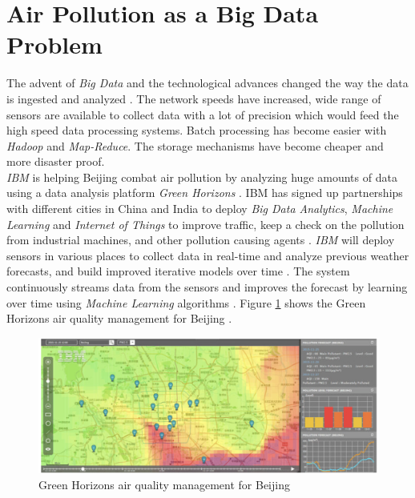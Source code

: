 \documentclass[sigconf]{acmart}
\begin{document}
\section{Air Pollution as a Big Data Problem}
The advent of {\em Big Data} and the technological advances changed the way the data is ingested and analyzed \cite{www-ibm1}. The network speeds have increased, wide range of sensors are available to collect data with a lot of precision which would feed the high speed data processing systems. Batch processing has become easier with {\em Hadoop} and {\em Map-Reduce}. The storage mechanisms have become cheaper and more disaster proof. \\
{\em IBM} is helping Beijing combat air pollution by analyzing huge amounts of data using a data analysis platform {\em Green Horizons} \cite{www-huff}. IBM has signed up partnerships with different cities in China and India to deploy {\em Big Data Analytics}, {\em Machine Learning} and {\em Internet of Things} to improve traffic, keep a check on the pollution from industrial machines, and other pollution causing agents \cite{www-huff}. {\em IBM} will deploy sensors in various places to collect data in real-time and analyze previous weather forecasts, and build improved iterative models over time \cite{www-huff}. The system continuously streams data from the sensors and improves the forecast by learning over time using {\em Machine Learning} algorithms \cite{www-huff}. Figure \ref{fig:Fig1} shows the Green Horizons air quality management for Beijing \cite{www-huff}.

\begin{figure}
\includegraphics[width=1.0\textwidth]{images/fig1.png}
\caption{Green Horizons air quality management for Beijing \cite{www-huff}}
\label{fig:Fig1}
\end{figure}
\end{document}
